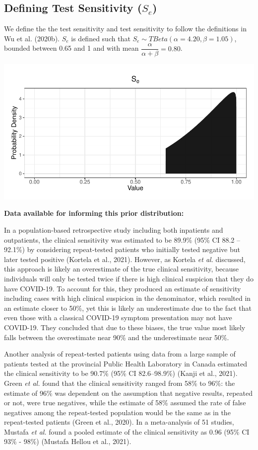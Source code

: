 \documentclass[12pt,twoside]{smiththesis}
\begin{document}
\hypertarget{defining-test-sensitivity-s_e}{%
\subsection{\texorpdfstring{Defining Test Sensitivity (\(S_e\))}{Defining Test Sensitivity (S\_e)}}\label{defining-test-sensitivity-s_e}}

We define the the test sensitivity and test sensitivity to follow the definitions in Wu et al. (2020b).
\(S_e\) is defined such that \(S_e \sim TBeta(\alpha = 4.20, \beta = 1.05)\), bounded between 0.65 and 1 and with mean \(\dfrac{\alpha}{\alpha + \beta} = 0.80\).
\begin{center}\includegraphics[width=0.8\linewidth]{thesis_files/figure-latex/unnamed-chunk-61-1} \end{center}

\textbf{Data available for informing this prior distribution:}

In a population-based retrospective study including both inpatients and outpatients, the clinical sensitivity was estimated to be 89.9\% (95\% CI 88.2 -- 92.1\%) by considering repeat-tested patients who initially tested negative but later tested positive (Kortela et al., 2021). However, as Kortela \emph{et al.} discussed, this approach is likely an overestimate of the true clinical sensitivity, because individuals will only be tested twice if there is high clinical suspicion that they do have COVID-19. To account for this, they produced an estimate of sensitivity including cases with high clinical suspicion in the denominator, which resulted in an estimate closer to 50\%, yet this is likely an underestimate due to the fact that even those with a classical COVID-19 symptom presentation may not have COVID-19. They concluded that due to these biases, the true value most likely falls between the overestimate near 90\% and the underestimate near 50\%.

Another analysis of repeat-tested patients using data from a large sample of patients tested at the provincial Public Health Laboratory in Canada estimated the clinical sensitivity to be 90.7\% (95\% CI 82.6--98.9\%) (Kanji et al., 2021). Green \emph{et al.} found that the clinical sensitivity ranged from 58\% to 96\%: the estimate of 96\% was dependent on the assumption that negative results, repeated or not, were true negatives, while the estimate of 58\% assumed the rate of false negatives among the repeat-tested population would be the same as in the repeat-tested patients (Green et al., 2020). In a meta-analysis of 51 studies, Mustafa \emph{et al.} found a pooled estimate of the clinical sensitivity as 0.96 (95\% CI 93\% - 98\%) (Mustafa Hellou et al., 2021).
\end{document}
